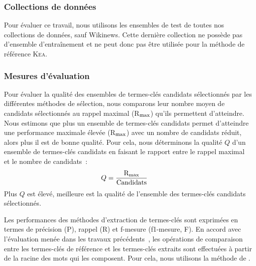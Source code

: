       \subsubsection{Collections de données}
      \label{subsubsec:main:domain_independent_keyphrase_extraction-keyphrase_candidate_selection-evaluation-evaluation_data}
        Pour évaluer ce travail, nous utilisons les ensembles de test de toutes
        nos collections de données, sauf Wikinews. Cette dernière collection ne
        possède pas d'ensemble d'entraînement et ne peut donc pas être utilisée
        pour la méthode de référence \textsc{Kea}.
      
      \subsubsection{Mesures d'évaluation}
      \label{subsubsec:main:domain_independent_keyphrase_extraction-keyphrase_candidate_selection-evaluation-evaluation_measures}
        Pour évaluer la qualité des ensembles de termes-clés candidats
        sélectionnés par les différentes méthodes de sélection, nous comparons
        leur nombre moyen de candidats sélectionnés au rappel maximal
        (R$_\textnormal{max}$) qu'ils permettent d'atteindre. Nous estimons que
        plus un ensemble de termes-clés candidats permet d'atteindre une
        performance maximale élevée (R$_\textnormal{max}$) avec un nombre de
        candidats réduit, alors plus il est de bonne qualité. Pour cela, nous
        déterminons la qualité $Q$ d'un ensemble de termes-clés candidats en
        faisant le rapport entre le rappel maximal et le nombre de candidats~:
        \begin{align}
          Q &= \frac{\textnormal{R}_{\textnormal{max}}}{\textnormal{Candidats}}
        \end{align}
        Plus $Q$ est élevé, meilleure est la qualité de l'ensemble des
        termes-clés candidats sélectionnés.

        Les performances des méthodes d'extraction de termes-clés sont exprimées
        en termes de précision (P), rappel (R) et f-mesure (f1-mesure, F). En
        accord avec l'évaluation menée dans les travaux
        précédents~\cite{kim2010semeval}, les opérations de comparaison entre
        les termes-clés de référence et les termes-clés extraits sont effectuées
        à partir de la racine des mots qui les composent. Pour cela, nous
        utilisons la méthode de .

